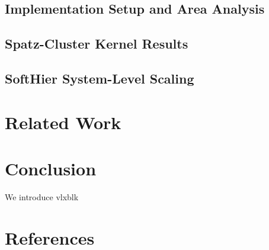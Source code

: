 \documentclass[conference]{IEEEtran}
\begin{document}
\subsection{Implementation Setup and Area Analysis}
\subsection{Spatz-Cluster Kernel Results}


\subsection{SoftHier System-Level Scaling}



\section{Related Work}



\section{Conclusion}
We introduce vlxblk
\section*{References}


\end{document}
